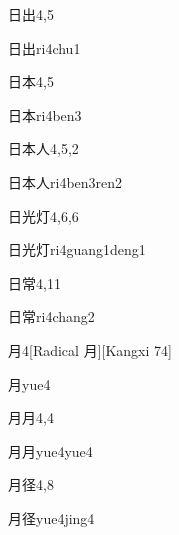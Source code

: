 \begin{entry}{日出}{4,5}
  \begin{phonetics}{日出}{ri4chu1}
  \end{phonetics}
\end{entry}

\begin{entry}{日本}{4,5}
  \begin{phonetics}{日本}{ri4ben3}
  \end{phonetics}
\end{entry}

\begin{entry}{日本人}{4,5,2}
  \begin{phonetics}{日本人}{ri4ben3ren2}
  \end{phonetics}
\end{entry}

\begin{entry}{日光灯}{4,6,6}
  \begin{phonetics}{日光灯}{ri4guang1deng1}
  \end{phonetics}
\end{entry}

\begin{entry}{日常}{4,11}
  \begin{phonetics}{日常}{ri4chang2}
  \end{phonetics}
\end{entry}

\begin{entry}{月}{4}[Radical 月][Kangxi 74]
  \begin{phonetics}{月}{yue4}
  \end{phonetics}
\end{entry}

\begin{entry}{月月}{4,4}
  \begin{phonetics}{月月}{yue4yue4}
  \end{phonetics}
\end{entry}

\begin{entry}{月径}{4,8}
  \begin{phonetics}{月径}{yue4jing4}
  \end{phonetics}
\end{entry}

